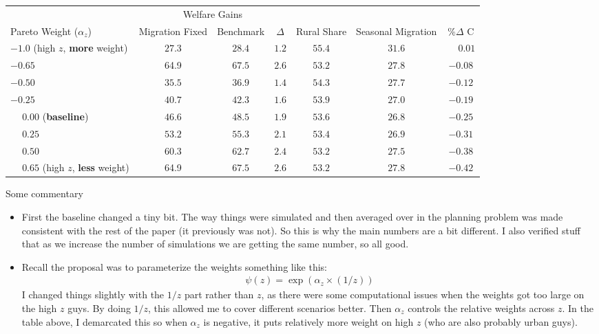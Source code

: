 \documentclass[12pt,pdftex]{article}
\begin{document}
\begin{onehalfspacing}
\begin{table}[h]
\begin{center}
\begin{tabular}{l c c c c c c}
\hline
\hline
& \multicolumn{3}{c}{Welfare Gains} & & \\
Pareto Weight ($\alpha_z$)		& Migration Fixed  & Benchmark & $\Delta$ & Rural Share & Seasonal Migration & $\% \Delta$ C\\
\cmidrule(lr){2-2} \cmidrule(lr){3-3} \cmidrule(lr){4-4} \cmidrule(lr){5-5} \cmidrule(lr){6-6} \cmidrule(lr){7-7}
$-1.0$ (high $z$, \textbf{more} weight)     & $27.3$  & $28.4 $  & $1.2$ & $55.4$& $31.6$ & $\phantom{-}0.01$\\
$-0.65$                                     &64.9 & $67.5$ & $2.6$ & $53.2$ & $27.8$& $-0.08$\\
$-0.50$                                      & $35.5$  & $36.9$ & $1.4$ & $54.3$& $27.7$ & $-0.12$\\
$-0.25$                                      & $40.7$  & $42.3$ & $1.6$ & $53.9$ & $27.0$& $-0.19$\\
$\phantom{-}0.00$ (\textbf{baseline})        & $46.6$  & $48.5$ & $1.9$ & $53.6$ & $26.8$& $-0.25$\\
$\phantom{-}0.25$                            &  $53.2$ & $55.3$ & $2.1$ & $53.4$ & $26.9$& $-0.31$\\
$\phantom{-}0.50$                            & 60.3  & $62.7$ & $2.4$ & $53.2$ & $27.5$ & $-0.38$\\
$\phantom{-}0.65$ (high $z$, \textbf{less} weight) &64.9 & $67.5$ & $2.6$ & $53.2$ & $27.8$ & $-0.42$\\
\hline
\end{tabular}
\parbox[c]{6.9in}{%
{\footnotesize  \vspace{0.1cm} }
}
\end{center}
\end{table}

Some commentary
\begin{itemize}
\item First the baseline changed a tiny bit. The way things were simulated and then averaged over in the planning problem was made consistent with the rest of the paper (it previously was not). So this is why the main numbers are a bit different. I also verified stuff that as we increase the number of simulations we are getting the same number, so all good.

\item Recall the proposal was to parameterize the weights something like this:
\begin{align}
\psi(z) = \exp(\alpha_z \times (1/z) )
\end{align}
I changed things slightly with the $1/z$ part rather than $z$, as there were some computational issues when the weights got too large on the high $z$ guys. By doing $1/z$, this allowed me to cover different scenarios better. Then $\alpha_z$ controls the relative weights across $z$. In the table above, I demarcated this so when $\alpha_z$ is negative, it puts relatively more weight on high $z$ (who are also probably urban guys).


\end{itemize}
\end{onehalfspacing}
\end{document}
